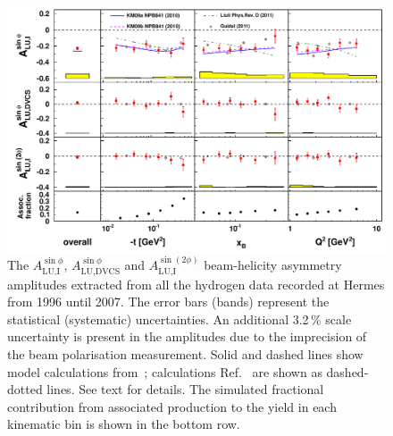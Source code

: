 \begin{figure}
 \begin{center}
 \includegraphics[width=15cm]{bsadvcsplots_eml_par13_bin6_release_all_pic_cluster_update}
  \caption{The $A_{\textrm{LU,I}}^{\sin\phi}$, $A_{\textrm{LU,DVCS}}^{\sin\phi}$ and
$A_{\textrm{LU,I}}^{\sin(2\phi)}$ beam-helicity asymmetry amplitudes extracted from all the hydrogen data recorded at H{\sc ermes}
from 1996 until 2007. The error bars (bands) represent the statistical
(systematic) uncertainties. An additional 3.2\,\% scale uncertainty is present in the amplitudes due to the imprecision of
the beam polarisation measurement. Solid and dashed lines show model calculations from~\cite{Kum09}; calculations  Ref.~\cite{Liu11} are shown as dashed-dotted lines. See text for details. The simulated fractional contribution from associated production to the yield in each kinematic bin is shown in the bottom row.}
  \label{bsa_xbjrange}
 \end{center}
\end{figure}

